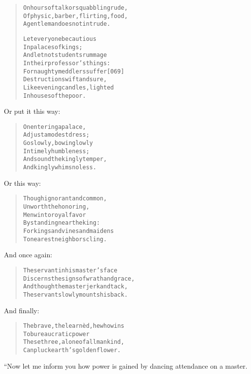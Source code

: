 \documentclass[article, twoside, 14pt]{memoir}
\renewenvironment{verbatim}{%
\begin{quote}%
\vskip -10pt%
\begin{alltt}\normalfont\large}{\end{alltt}%
\end{quote}%
\vskip -10pt
} %
\begin{document}
\begin{verbatim}
On hours of talk or squabbling rude,
Of physic, barber, flirting, food,
A gentleman does not intrude.

Let everyone be cautious
    In palaces of kings;
And let not students rummage
    In their professor's things:
For naughty meddlers suffer                             [069]
    Destruction swift and sure,
Like evening candles, lighted
    In houses of the poor.
\end{verbatim}
Or put it this way:

\begin{verbatim}
On entering a palace,
    Adjust a modest dress;
Go slowly, bowing lowly
    In timely humbleness;
And sound the kingly temper,
    And kingly whims no less.
\end{verbatim}
Or this way:

\begin{verbatim}
Though ignorant and common,
    Unworth the honoring,
Men win to royal favor
    By standing near the king:
For kings and vines and maidens
    To nearest neighbors cling.
\end{verbatim}
And once again:

\begin{verbatim}
The servant in his master's face
Discerns the signs of wrath and grace,
And though the master jerk and tack,
The servant slowly mounts his back.
\end{verbatim}
And finally:

\begin{verbatim}
The brave, the learnèd, he who wins
    To bureaucratic power
These three, alone of all mankind,
    Can pluck earth's golden flower.
\end{verbatim}
“Now let me inform you how power is gained by dancing attendance on
a master.
\end{document}
